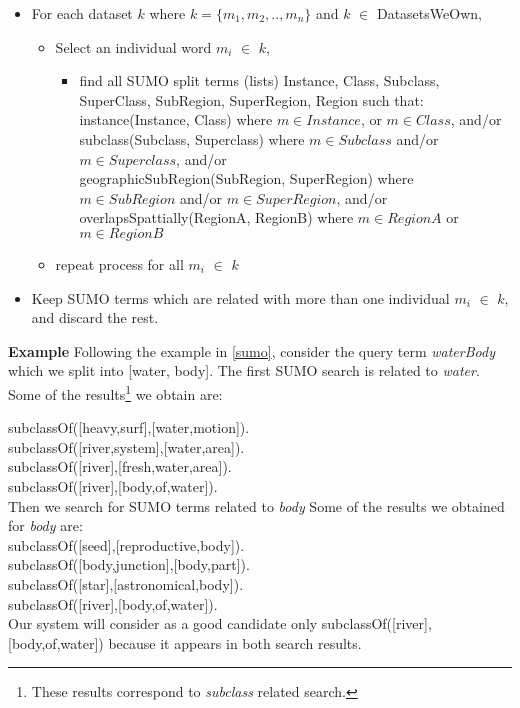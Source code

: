 \documentclass[a4paper,10pt]{article}
\begin{document}
\begin{itemize}
\item For each dataset $k$ where $k=\{m_1,m_2,..,m_n\}$ and $k$ $\in$ DatasetsWeOwn,

\begin{itemize}
 \item Select an individual word $m_i$ $\in$ $k$,


		\begin{itemize} 
			\item find all SUMO split terms (lists)  Instance, Class, Subclass, SuperClass, SubRegion, SuperRegion, Region such that:\\
						\indent instance(Instance, Class) where $m \in Instance$, or $m \in Class$, and/or\\
						\indent subclass(Subclass, Superclass) where $m \in Subclass$ and/or $m \in Superclass$, and/or\\
			\indent  geographicSubRegion(SubRegion, SuperRegion) where $m \in SubRegion$  and/or $m \in SuperRegion$, and/or \\
				 \indent overlapsSpattially(RegionA, RegionB) where $m \in RegionA$ or $m \in RegionB$
		
\end{itemize}
		\item repeat process for all $m_i$ $\in$ $k$
	\end{itemize}
\item  Keep SUMO terms which are related with more than one  individual $m_i$ $\in$ $k$,  and discard the rest.
		 
	\end{itemize}

  	
 \textbf{Example} Following the example in \ref{sumo}, consider the query term \textit{waterBody} which we split into [water, body]. The first SUMO search is related to \textit{water}. Some of the results\footnote{These results correspond to  \textit{subclass} related search.} we obtain are: 
 
\indent subclassOf([heavy,surf],[water,motion]).\\
\indent subclassOf([river,system],[water,area]).\\
\indent subclassOf([river],[fresh,water,area]).\\
\indent subclassOf([river],[body,of,water]). \\
 Then we search for SUMO terms related to \textit{body} Some of the results we obtained for \textit{body} are:\\
\indent  subclassOf([seed],[reproductive,body]).\\
\indent  subclassOf([body,junction],[body,part]).\\
\indent  subclassOf([star],[astronomical,body]).\\
\indent subclassOf([river],[body,of,water]).\\
 Our system will consider as a good candidate only subclassOf([river],[body,of,water]) because it appears in both search results.
  	 
\end{document}
